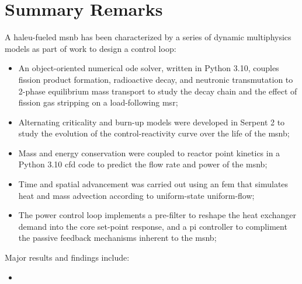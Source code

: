 \section{Summary Remarks}
A \acs{haleu}-\UF fueled \acs{msnb} has been characterized by a series of dynamic multiphysics models as part of work to design a control loop:
\begin{itemize}
    \item An object-oriented numerical \acs{ode} solver, written in Python 3.10, couples fission product formation, radioactive decay, and neutronic transmutation to 2-phase equilibrium mass transport to study the \Xe decay chain and the effect of fission gas stripping on a load-following \acs{msr};
    \item Alternating criticality and burn-up models were developed in Serpent 2 to study the evolution of the control-reactivity curve over the life of the \acs{msnb};
    \item Mass and energy conservation were coupled to reactor point kinetics in a Python 3.10 \acs{cfd} code to predict the flow rate and power of the \acs{msnb};
    \item Time and spatial advancement was carried out using an \acs{fem} that simulates heat and mass advection according to uniform-state uniform-flow;
    \item The power control loop implements a pre-filter to reshape the heat exchanger demand into the core set-point response, and a \acs{pi} controller to compliment the passive feedback mechanisms inherent to the \acs{msnb};
\end{itemize}

Major results and findings include:
\begin{itemize}
    \item 
\end{itemize}